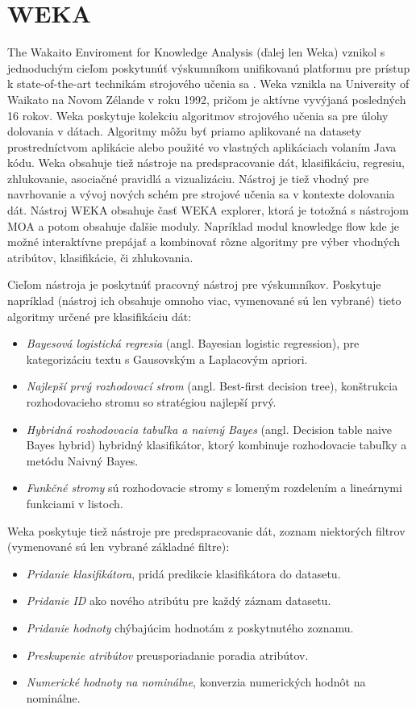 \section{WEKA}
The Wakaito Enviroment for Knowledge Analysis (ďalej len Weka) vznikol s jednoduchým cieľom poskytunúť výskumníkom unifikovanú platformu pre prístup k state-of-the-art technikám strojového učenia sa \citep{hall2009weka}. Weka vznikla na University of Waikato na Novom Zélande v roku 1992, pričom je aktívne vyvýjaná posledných 16 rokov. Weka poskytuje kolekciu algoritmov strojového učenia sa pre úlohy dolovania v dátach. Algoritmy môžu byť priamo aplikované na datasety prostredníctvom aplikácie alebo použité vo vlastných aplikáciach volaním Java kódu. Weka obsahuje tiež nástroje na predspracovanie dát, klasifikáciu, regresiu, zhlukovanie, asociačné pravidlá a vizualizáciu. Nástroj je tiež vhodný pre navrhovanie a vývoj nových schém pre strojové učenia sa v kontexte dolovania dát. Nástroj WEKA obsahuje časť WEKA explorer, ktorá je totožná s nástrojom MOA a potom obsahuje ďalšie moduly. Napríklad modul knowledge flow kde je možné interaktívne prepájať a kombinovať rôzne algoritmy pre výber vhodných atribútov, klasifikácie, či zhlukovania.
\par
Cieľom nástroja je poskytnúť pracovný nástroj pre výskumníkov. Poskytuje napríklad (nástroj ich obsahuje omnoho viac, vymenované sú len vybrané) tieto algoritmy určené pre klasifikáciu dát:
\begin{itemize}
	\item \textit{Bayesová logistická regresia} (angl. Bayesian logistic regression), pre kategorizáciu textu s Gausovským a Laplacovým apriori.
	\item \textit{Najlepší prvý rozhodovací strom} (angl. Best-first decision tree), konštrukcia rozhodovacieho stromu so stratégiou najlepší prvý.
	\item \textit{Hybridná rozhodovacia tabuľka a naivný Bayes} (angl. Decision table naive Bayes hybrid) hybridný klasifikátor, ktorý kombinuje rozhodovacie tabuľky a metódu Naivný Bayes.
	\item \textit{Funkčné stromy} sú rozhodovacie stromy s lomeným rozdelením a lineárnymi funkciami v listoch.
\end{itemize}
Weka poskytuje tiež nástroje pre predspracovanie dát, zoznam niektorých filtrov (vymenované sú len vybrané základné filtre):
\begin{itemize}
	\item \textit{Pridanie klasifikátora}, pridá predikcie klasifikátora do datasetu.
	\item \textit{Pridanie ID} ako nového atribútu pre každý záznam datasetu.
	\item \textit{Pridanie hodnoty} chýbajúcim hodnotám z poskytnutého zoznamu.
	\item \textit{Preskupenie atribútov} preusporiadanie poradia atribútov.
	\item \textit{Numerické hodnoty na nominálne}, konverzia numerických hodnôt na nominálne.
\end{itemize}
\label{fig:weka}

